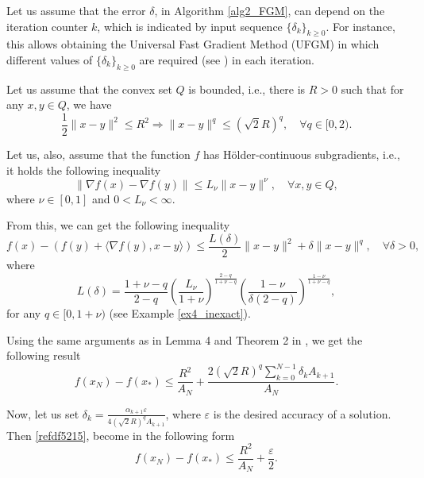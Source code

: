 \documentclass[11pt]{amsart}
\theoremstyle{definition}
\numberwithin{equation}{section}
\begin{document}
Let us assume that the error $\delta$, in Algorithm \ref{alg2_FGM}, can depend on the iteration counter $k$, which is indicated by input sequence $\{\delta_k\}_{k \geq 0}$. For instance, this allows obtaining the Universal Fast Gradient Method (UFGM) in which different values of  $\{\delta_k\}_{k \geq 0}$ are required (see \cite{Baimurzina2019Universal,Nesterov2015Universal}) in each iteration. 

Let us assume that the convex set $Q$ is bounded, i.e., there is $R>0$ such that for any $x,y \in Q$, we have 
\begin{equation}
    \frac{1}{2 }\|x - y\|^2 \leq R^2 \Longrightarrow \|x - y\|^q \leq \left(\sqrt{2} R\right)^q, \quad \forall q \in [0, 2). 
\end{equation}

Let us, also, assume that the function $f$ has H\"{o}lder-continuous subgradients, i.e., it holds the following inequality 
\begin{equation}\label{holder_condd}
    \left\|\nabla f(x) - \nabla f(y)\right\| \leq L_{\nu} \|x - y\|^{\nu}, \quad \forall x, y \in Q,
\end{equation}
where $\nu \in [0, 1]$ and $0 < L_{\nu} <  \infty$. 

From this, we can get the following inequality
\begin{equation*}
    f(x) - \left( f(y) + \langle \nabla f(y), x - y \rangle \right) \leq  \frac{L(\delta)}{2}\|x-y\|^2+\delta\|x-y\|^q, \quad \forall \delta > 0,  
\end{equation*}
where 
\[
    L(\delta)=\frac{1+\nu-q}{2-q}\left(\frac{L_\nu}{1+\nu}\right)^{\frac{2-q}{1+\nu-q}}\left(\frac{1-\nu}{\delta(2-q)}\right)^{\frac{1-\nu}{1+\nu-q}},
\]
for any $q \in [0,1+ \nu)$ (see Example \ref{ex4_inexact}).  

Using the same arguments as in Lemma 4 and Theorem 2 in \cite{Gasnikov2019fast}, we get the following result
\begin{equation}\label{refdf5215}
    f(x_N) - f(x_*) \leq \frac{R^2}{A_N} + \frac{2\left(\sqrt{2} R\right)^q \sum_{k = 0}^{N-1} \delta_k A_{k+1}}{A_N}. 
\end{equation}

Now, let us set $\delta_k = \frac{\alpha_{k+1} \varepsilon}{4\left(\sqrt{2} R\right)^q  A_{k+1} } $, where $\varepsilon$ is the desired accuracy of a solution. Then \eqref{refdf5215}, become in the following form
\begin{equation}\label{refdf1201}
    f(x_N) - f(x_*) \leq \frac{R^2}{A_N} + \frac{\varepsilon}{2}. 
\end{equation}
\end{document}
